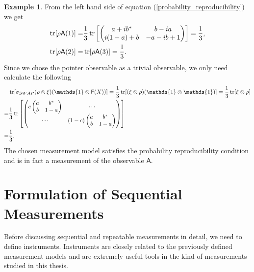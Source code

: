 \documentclass[a4paper,12pt]{wihuri}
\theoremstyle{definition}
\newtheorem{example}{Example}
\numberwithin{definition}{section}
\numberwithin{example}{section}
\numberwithin{theorem}{section}
\numberwithin{proposition}{section}
\numberwithin{lemma}{section}
\newcommand{\A}{\mathsf{A}}%
\newcommand{\F}{\mathsf{F}}%
\newcommand{\id}{\mathds{1}}
\DeclareMathOperator{\tr}{tr}
\begin{document}
\begin{example}
From the left hand side of equation (\ref{probability_reproducibility}) we get
\begin{align*}
\tr[\rho\A(1)] =& \frac{1}{3}\tr\left[\begin{pmatrix}
a+ib^* & b-ia\\
i(1-a)+b & -a -ib +1
\end{pmatrix}\right] = \frac{1}{3}, \\
\tr[\rho\A(2)] =& \tr[\rho\A(3)] = \frac{1}{3}\text.
\end{align*}
Since we chose the pointer observable as a trivial observable, we only need calculate the following
\begin{align*}
&\tr[\sigma_{SWAP}(\rho \otimes \xi)(\id \otimes \F(X))] = \frac{1}{3}\tr[(\xi \otimes \rho)(\id \otimes \id)] = \frac{1}{3}\tr[\xi \otimes \rho]\\
= &\frac{1}{3}\tr\left[\begin{pmatrix}
c\begin{pmatrix}
a & b^* \\
b & 1-a
\end{pmatrix} & \cdots \\
\cdots & (1-c)\begin{pmatrix}
a & b^* \\
b & 1-a
\end{pmatrix}
\end{pmatrix} \right] \\
=& \frac{1}{3}\text.
\end{align*}
The chosen measurement model satisfies the probability reproducibility condition and is in fact a measurement of the observable $\A$.
\end{example}





\section{Formulation of Sequential Measurements}
%
Before discussing sequential and repeatable measurements in detail, we need to define instruments. Instruments are closely related to the previously defined measurement models and are extremely useful tools in the kind of measurements studied in this thesis.
\end{document}
